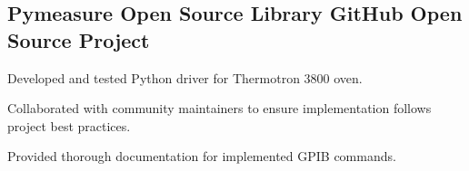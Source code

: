 \documentclass[letter,10pt]{article}
\begin{document}
\subsection{{Pymeasure Open Source Library \hfill GitHub Open Source Project}}
\subtext{Contributor 
\hfill \underline{\href{https://github.com/pymeasure/pymeasure}{github.com/pymeasure/pymeasure}}}
\begin{zitemize}
\item Developed and tested Python driver for Thermotron 3800 oven. 
\item Collaborated with community maintainers to ensure implementation follows project best practices. 
\item Provided thorough documentation for implemented GPIB commands. 
\end{zitemize}

\end{document}
